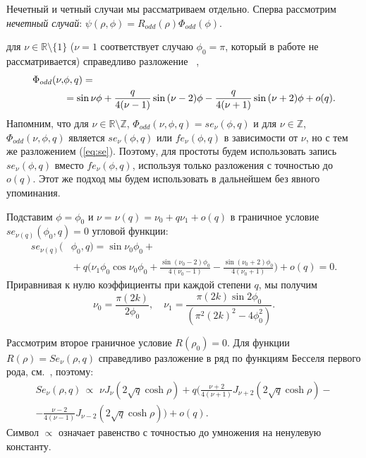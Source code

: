 Нечетный и четный случаи мы рассматриваем отдельно. Сперва рассмотрим
\textit{нечетный случай}: $\psi(\rho,\phi) = R_{odd}(\rho)\Phi_{odd}(\phi)  $.

для $\nu \in \mathbb{R} \setminus \{1\}$ 
($\nu=1$ соответствует случаю  $\phi_0=\pi$, который в работе не рассматривается)
справедливо разложение ~\cite[\S 2.2]{wref12},
\begin{align}
\Phi_{odd}(\nu, &{} \phi, q)  = \notag\\
	&{} = \sin{\nu\phi} + 
	\frac{q}{4(\nu-1)} \sin{(\nu-2)\phi} -\frac{q}{4(\nu+1)} \sin{(\nu+2)\phi} + o(q). \label{eq:se}
\end{align}
Напомним, что для $\nu \in \mathbb{R} \setminus \mathbb{Z}$, $\Phi_{odd}(\nu, \phi, q) = se_\nu(\phi, q)$ и для  $\nu \in  \mathbb{Z}$, $\Phi_{odd}(\nu, \phi, q)$ является $se_\nu(\phi, q) $ или $fe_\nu(\phi, q)$ в зависимости от $\nu$, но с тем же разложением (\ref{eq:se}). 
Поэтому, для простоты будем использовать запись $se_\nu(\phi, q)$ вместо $fe_\nu(\phi, q)$, используя только разложения с точностью до $o(q)$. Этот же подход мы будем использовать в дальнейшем без явного упоминания.

Подставим  $\phi=\phi_0$ и $\nu=\nu(q) = \nu_0 + q \nu_1 + o(q)$
в граничное условие $se_{\nu(q)}(\phi_0, q)=0$ угловой функции:
 \begin{align*}
 se_{\nu(q)}(& \phi_0, q) =  \sin \nu_0 \phi_0 + \\
&{} + q \biggl( \nu_1 \phi_0 \cos \nu_0 \phi_0 + \frac{\sin(\nu_0-2)\phi_0}{4(\nu_0-1)}  -\frac{\sin(\nu_0+2)\phi_0}{4(\nu_0+1)} \biggr) + o(q) =0.
\end{align*}
Приравнивая к нулю коэффициенты при каждой степени  $q$, мы получим
\begin{equation*}
\nu_0 = \frac{\pi (2k)}{2\phi_0}, \quad \nu_1 = \frac{\pi (2k) \sin 2 \phi_0}{(\pi^2 (2k)^2 - 4\phi_0^2)}.
\end{equation*}

Рассмотрим второе граничное условие $R(\rho_0) = 0$. 
Для функции  $R(\rho)=Se_\nu(\rho, q)$
справедливо разложение в ряд по функциям Бесселя первого рода, см.~\cite[гл. VIII]{mclachlan}, поэтому:
\begin{multline*}
Se_\nu(\rho, q) \,\propto\,\,  \nu J_\nu(2\sqrt{q} \cosh{\rho})  
+q \bigg( \frac{\nu + 2}{4(\nu+1)} J_{\nu+2}(2\sqrt{q} \cosh{\rho}) - \\
- \frac{\nu - 2}{4(\nu-1)} J_{\nu-2}(2\sqrt{q} \cosh{\rho}) \bigg) + o(q).
\end{multline*}
Символ $\propto$ означает равенство с точностью до умножения на ненулевую константу.

